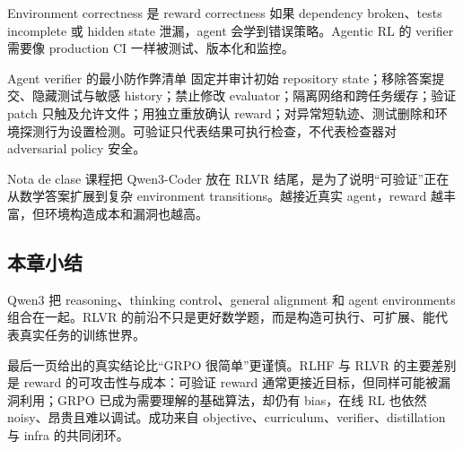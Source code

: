 \begin{warningbox}{Environment correctness 是 reward correctness}
如果 dependency broken、tests incomplete 或 hidden state 泄漏，agent 会学到错误策略。Agentic RL 的 verifier 需要像 production CI 一样被测试、版本化和监控。
\end{warningbox}

\begin{importantbox}{Agent verifier 的最小防作弊清单}
固定并审计初始 repository state；移除答案提交、隐藏测试与敏感 history；禁止修改 evaluator；隔离网络和跨任务缓存；验证 patch 只触及允许文件；用独立重放确认 reward；对异常短轨迹、测试删除和环境探测行为设置检测。可验证只代表结果可执行检查，不代表检查器对 adversarial policy 安全。
\end{importantbox}

\begin{knowledgebox}{Nota de clase}
课程把 Qwen3-Coder 放在 RLVR 结尾，是为了说明“可验证”正在从数学答案扩展到复杂 environment transitions。越接近真实 agent，reward 越丰富，但环境构造成本和漏洞也越高。
\end{knowledgebox}

\subsection{本章小结}

Qwen3 把 reasoning、thinking control、general alignment 和 agent environments 组合在一起。RLVR 的前沿不只是更好数学题，而是构造可执行、可扩展、能代表真实任务的训练世界。


最后一页给出的真实结论比“GRPO 很简单”更谨慎。RLHF 与 RLVR 的主要差别是 reward 的可攻击性与成本：可验证 reward 通常更接近目标，但同样可能被漏洞利用；GRPO 已成为需要理解的基础算法，却仍有 bias，在线 RL 也依然 noisy、昂贵且难以调试。成功来自 objective、curriculum、verifier、distillation 与 infra 的共同闭环。

